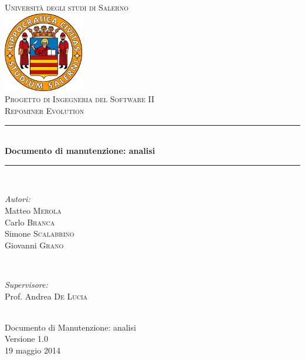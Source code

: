 \documentclass[a4paper, 12pt, italian]{report}
\begin{document}
\begin{titlepage}
\newcommand{\HRule}{\rule{\linewidth}{0.5mm}} 
\center 
\textsc{\LARGE Università degli studi di Salerno}\\[1cm] 
\includegraphics[width=3.5cm]{img/logo.jpg} \\[1cm]
\textsc{\large Progetto di Ingegneria del Software II}\\[0.5cm]
\textsc{\Large Repominer Evolution}\\[0.5cm] 
 \HRule \\[0.4cm]
{ \large \bfseries Documento di manutenzione: analisi}\\[0.4cm] 
\HRule \\[1.5cm]

\begin{minipage}{0.4\textwidth}
\begin{flushleft} \large
\emph{Autori:}\\
Matteo \textsc{Merola}\\
Carlo \textsc{Branca}\\
Simone \textsc{Scalabrino}\\
Giovanni \textsc{Grano}\\
\end{flushleft}
\end{minipage}
~
\begin{minipage}{0.4\textwidth}
\begin{flushright} \large
\emph{Supervisore:} \\
Prof. Andrea \textsc{De Lucia}
\end{flushright}
\end{minipage}\\[2.5cm]

{\Large Documento di Manutenzione: analisi}\\
Versione 1.0\\[1cm]

{\large 19 maggio 2014} %

\vfill

\end{titlepage}	
       
	\setcounter{tocdepth}{1}	
	\tableofcontents
	\listoffigures
	
	
	
	
	
	
{}

\end{document}
